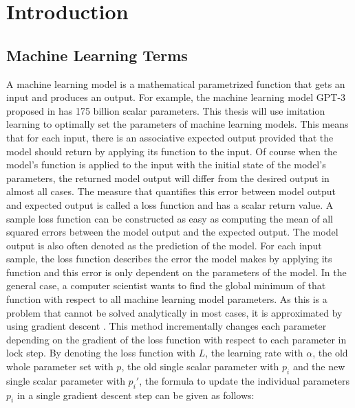 \documentclass[draft,final]{vutinfth} %
\begin{document}

    \tableofcontents %

    \mainmatter


    \chapter{Introduction}

    \section{Machine Learning Terms}
    A machine learning model is a mathematical parametrized function that gets an input and produces an output.
    For example, the machine learning model GPT-3 proposed in \cite{GPT-3} has 175 billion scalar parameters.
    This thesis will use imitation learning to optimally set the parameters of machine learning models.
    This means that for each input, there is an associative expected output provided that the model should return by applying its function to the input.
    Of course when the model's function is applied to the input with the initial state of the model's parameters, the returned model output will differ from the desired output in almost all cases.
    The measure that quantifies this error between model output and expected output is called a loss function and has a scalar return value.
    A sample loss function can be constructed as easy as computing the mean of all squared errors between the model output and the expected output.
    The model output is also often denoted as the prediction of the model.
    For each input sample, the loss function describes the error the model makes by applying its function and this error is only dependent on the parameters of the model.
    In the general case, a computer scientist wants to find the global minimum of that function with respect to all machine learning model parameters.
    As this is a problem that cannot be solved analytically in most cases, it is approximated by using gradient descent \cite{GradientDescent}.
    This method incrementally changes each parameter depending on the gradient of the loss function with respect to each parameter in lock step.
    By denoting the loss function with $L$, the learning rate with $\alpha$, the old whole parameter set with $p$, the old single scalar parameter with $p_i$ and the new single scalar parameter with $p_i'$, the formula to update the individual parameters $p_i$ in a single gradient descent step can be given as follows:
\end{document}
